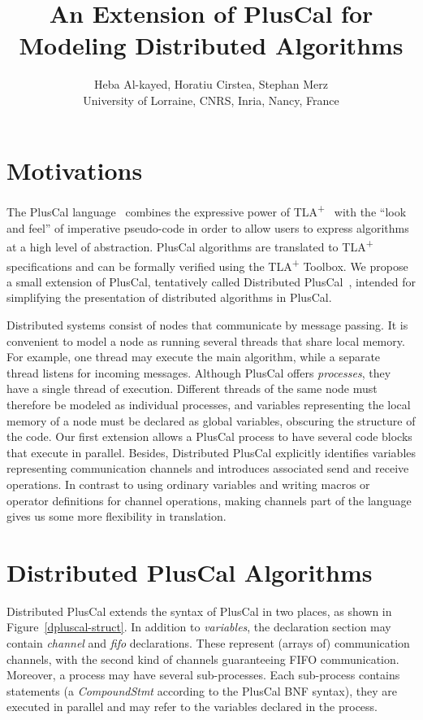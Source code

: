 \documentclass{article}
\title{An Extension of PlusCal for Modeling Distributed Algorithms}
\author{%
  Heba Al-kayed, Horatiu Cirstea, Stephan Merz\\
  University of Lorraine, CNRS, Inria, Nancy, France%
}
\date{}
\newcommand{\tlaplus}{TLA\textsuperscript{+}\xspace}
\begin{document}

\maketitle


\section{Motivations}

The PlusCal language~\cite{pcalAlgo,wayne:practical} combines the expressive power of \tlaplus~\cite{tlabook} with the ``look and feel'' of imperative pseudo-code in order to allow users to express algorithms at a high level of abstraction. PlusCal algorithms are translated to \tlaplus specifications and can be formally verified using the \tlaplus Toolbox. We propose a small extension of PlusCal, tentatively called Distributed PlusCal~\cite{dpluscal}, intended for simplifying the presentation of distributed algorithms in PlusCal.

Distributed systems consist of nodes that communicate by message passing. It is convenient to model a node as running several threads that share local memory. For example, one thread may execute the main algorithm, while a separate thread listens for incoming messages. Although PlusCal offers \emph{processes}, they have a single thread of execution. Different threads of the same node must therefore be modeled as individual processes, and variables representing the local memory of a node must be declared as global variables, obscuring the structure of the code. Our first extension allows a PlusCal process to have several code blocks that execute in parallel. Besides, Distributed PlusCal explicitly identifies variables representing communication channels and introduces associated send and receive operations. In contrast to using ordinary variables and writing macros or operator definitions for channel operations, making channels part of the language gives us some more flexibility in translation.


\section{Distributed PlusCal Algorithms}

Distributed PlusCal extends the syntax of PlusCal in two places, as shown in Figure~\ref{dpluscal-struct}. In addition to \emph{variables}, the declaration section may contain \emph{channel} and \emph{fifo} declarations. These represent (arrays of) communication channels, with the second kind of channels guaranteeing FIFO communication. Moreover, a process may have several sub-processes. Each sub-process contains statements (a \emph{CompoundStmt} according to the PlusCal BNF syntax), they are executed in parallel and may refer to the variables declared in the process.
\end{document}
